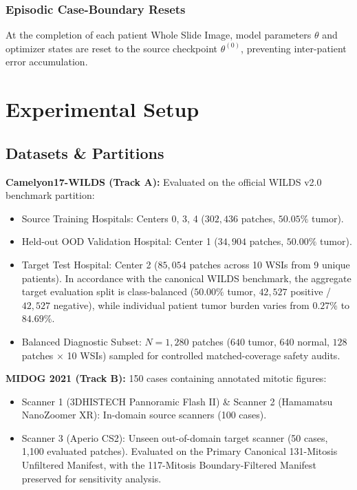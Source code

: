 \documentclass[conference]{IEEEtran}
\begin{document}
\subsubsection{Episodic Case-Boundary Resets}
At the completion of each patient Whole Slide Image, model parameters $\theta$ and optimizer states are reset to the source checkpoint $\theta^{(0)}$, preventing inter-patient error accumulation.

\section{Experimental Setup}

\subsection{Datasets \& Partitions}
\textbf{Camelyon17-WILDS (Track A):} Evaluated on the official WILDS v2.0 benchmark partition:
\begin{itemize}
    \item Source Training Hospitals: Centers 0, 3, 4 ($302{,}436$ patches, $50.05\%$ tumor).
    \item Held-out OOD Validation Hospital: Center 1 ($34{,}904$ patches, $50.00\%$ tumor).
    \item Target Test Hospital: Center 2 ($85{,}054$ patches across 10 WSIs from 9 unique patients). In accordance with the canonical WILDS benchmark, the aggregate target evaluation split is class-balanced ($50.00\%$ tumor, $42{,}527$ positive / $42{,}527$ negative), while individual patient tumor burden varies from $0.27\%$ to $84.69\%$.
    \item Balanced Diagnostic Subset: $N=1{,}280$ patches ($640$ tumor, $640$ normal, $128$ patches $\times$ 10 WSIs) sampled for controlled matched-coverage safety audits.
\end{itemize}

\textbf{MIDOG 2021 (Track B):} 150 cases containing annotated mitotic figures:
\begin{itemize}
    \item Scanner 1 (3DHISTECH Pannoramic Flash II) \& Scanner 2 (Hamamatsu NanoZoomer XR): In-domain source scanners (100 cases).
    \item Scanner 3 (Aperio CS2): Unseen out-of-domain target scanner (50 cases, 1,100 evaluated patches). Evaluated on the Primary Canonical 131-Mitosis Unfiltered Manifest, with the 117-Mitosis Boundary-Filtered Manifest preserved for sensitivity analysis.
\end{itemize}
\end{document}
